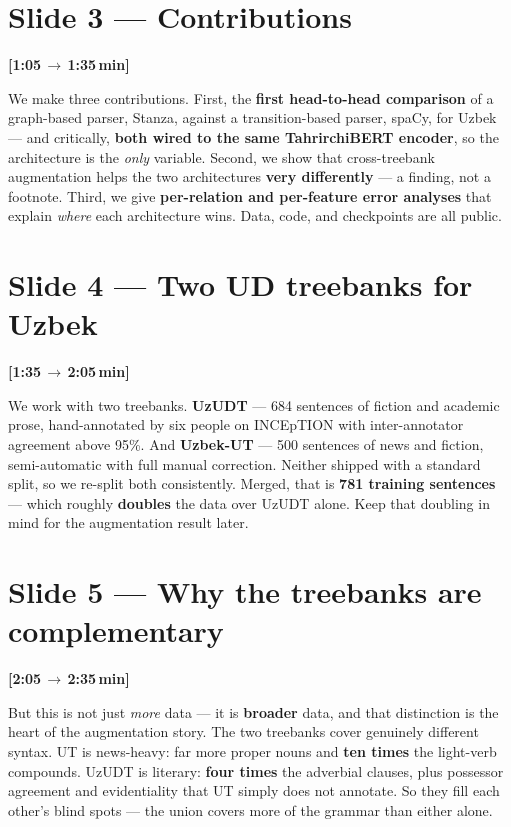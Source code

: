 \documentclass[12pt,a4paper]{article}
\newcommand{\timing}[2]{%
   \par\noindent\textbf{\small [#1\,$\to$\,#2\,min]}\par\vspace{0.2em}}
\newcommand{\say}[1]{\textbf{#1}}
\begin{document}
\section*{Slide 3 --- Contributions}
\timing{1:05}{1:35}

We make three contributions. First, the \say{first head-to-head
comparison} of a graph-based parser, Stanza, against a transition-based
parser, spaCy, for Uzbek --- and critically, \say{both wired to the same
TahrirchiBERT encoder}, so the architecture is the \emph{only} variable.
Second, we show that cross-treebank augmentation helps the two
architectures \say{very differently} --- a finding, not a footnote.
Third, we give \say{per-relation and per-feature error analyses} that
explain \emph{where} each architecture wins. Data, code, and checkpoints
are all public.

\section*{Slide 4 --- Two UD treebanks for Uzbek}
\timing{1:35}{2:05}

We work with two treebanks. \say{UzUDT} --- 684 sentences of fiction and
academic prose, hand-annotated by six people on INCEpTION with
inter-annotator agreement above 95\%. And \say{Uzbek-UT} --- 500
sentences of news and fiction, semi-automatic with full manual
correction. Neither shipped with a standard split, so we re-split both
consistently. Merged, that is \textbf{781 training sentences} --- which
roughly \say{doubles} the data over UzUDT alone. Keep that doubling in
mind for the augmentation result later.

\section*{Slide 5 --- Why the treebanks are complementary}
\timing{2:05}{2:35}

But this is not just \emph{more} data --- it is \say{broader} data, and
that distinction is the heart of the augmentation story. The two
treebanks cover genuinely different syntax. UT is news-heavy: far more
proper nouns and \say{ten times} the light-verb compounds. UzUDT is
literary: \say{four times} the adverbial clauses, plus possessor
agreement and evidentiality that UT simply does not annotate. So they
fill each other's blind spots --- the union covers more of the grammar
than either alone.
\end{document}
